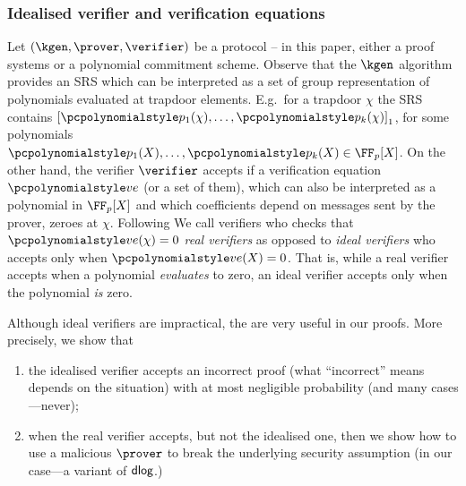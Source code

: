 \documentclass[runningheads,11pt]{llncs}
\begin{document}
\subsubsection{Idealised verifier and verification equations}
Let $(\kgen, \prover, \verifier)$ be a protocol -- in this paper, either a proof
systems or a polynomial commitment scheme. Observe that the $\kgen$ algorithm
provides an SRS which can be interpreted as a set of group representation of
polynomials evaluated at trapdoor elements. E.g.~for a trapdoor $\chi$ the SRS
contains $\gone{\p{p_1}(\chi), \ldots, \p{p_k}(\chi)}$, for some polynomials
$\p{p_1}(X), \ldots, \p{p_k}(X) \in \FF_p[X]$. On the other hand, the verifier
$\verifier$ accepts if a verification equation $\vereq$ (or a set of them),
which can also be interpreted as a polynomial in $\FF_p[X]$ and which
coefficients depend on messages sent by the prover, zeroes at $\chi$. Following
\cite{EPRINT:GabWilCio19} We call verifiers who checks that $\vereq(\chi) = 0$
\emph{real verifiers} as opposed to \emph{ideal verifiers} who accepts only when
$\vereq(X) = 0$. That is, while a real verifier accepts when a polynomial
\emph{evaluates} to zero, an ideal verifier accepts only when the polynomial
\emph{is} zero.

Although ideal verifiers are impractical, the are very useful in our
proofs. More precisely, we show that
\begin{enumerate}[(1)]
\item the idealised verifier accepts an incorrect proof (what ``incorrect''
  means depends on the situation) with at most negligible probability (and many
  cases---never);
\item when the real verifier accepts, but not the idealised one, then we show
  how to use a malicious $\prover$ to break the underlying security assumption
  (in our case---a variant of $\mathsf{dlog}$.)
\end{enumerate}


\end{document}
